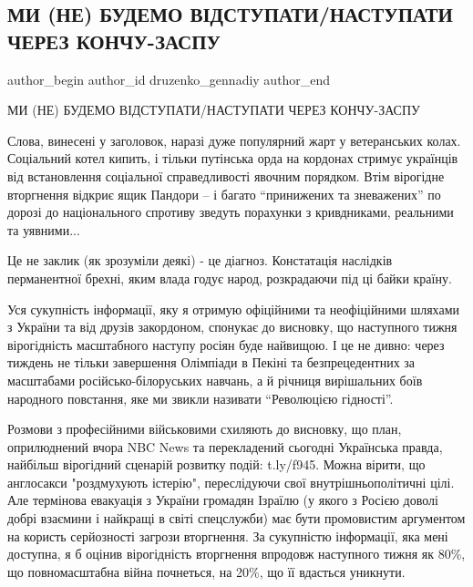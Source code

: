  
 
 
 
 
 
\subsection{МИ (НЕ) БУДЕМО ВІДСТУПАТИ/НАСТУПАТИ ЧЕРЕЗ КОНЧУ-ЗАСПУ}
\label{sec:12_02_2022.fb.druzenko_gennadiy.1.my_ne_budemo_vidstupaty_nastupaty_cherez_koncha_zaspu}
 
\ifcmt
 author_begin
   author_id druzenko_gennadiy
 author_end
\fi

МИ (НЕ) БУДЕМО ВІДСТУПАТИ/НАСТУПАТИ ЧЕРЕЗ КОНЧУ-ЗАСПУ

Слова, винесені у заголовок, наразі дуже популярний жарт у ветеранських колах.
Соціальний котел кипить, і тільки путінська орда на кордонах стримує українців
від встановлення соціальної справедливості явочним порядком. Втім вірогідне
вторгнення відкриє ящик Пандори – і багато \enquote{принижених та зневажених} по дорозі
до національного спротиву зведуть порахунки з кривдниками, реальними та
уявними...


Це не заклик (як зрозуміли деякі) - це діагноз. Констатація наслідків
перманентної брехні, яким влада годує народ, розкрадаючи під ці байки країну. 

Уся сукупність інформації, яку я отримую офіційними та неофіційними шляхами з
України та від друзів закордоном, спонукає до висновку, що наступного тижня
вірогідність масштабного наступу росіян буде найвищою. І це не дивно: через
тиждень не тільки завершення Олімпіади в Пекіні та безпрецедентних за
масштабами російсько-білоруських навчань, а й річниця вирішальних боїв
народного повстання, яке ми звикли називати \enquote{Революцією гідності}.

Розмови з професійними військовими схиляють до висновку, що план, оприлюднений
вчора NBC News та перекладений сьогодні Українська правда, найбільш вірогідний
сценарій розвитку подій: t.ly/f945. Можна вірити, що англосакси "роздмухують
істерію", переслідуючи свої внутрішньополітичні цілі. Але термінова евакуація з
України громадян Ізраїлю (у якого з Росією доволі добрі взаємини і найкращі в
світі спецслужби) має бути промовистим аргументом на користь серйозності
загрози вторгнення. За сукупністю інформації, яка мені доступна, я б оцінив
вірогідність вторгнення впродовж наступного тижня як 80\%, що повномасштабна
війна почнеться, на 20\%, що її вдасться уникнути.

